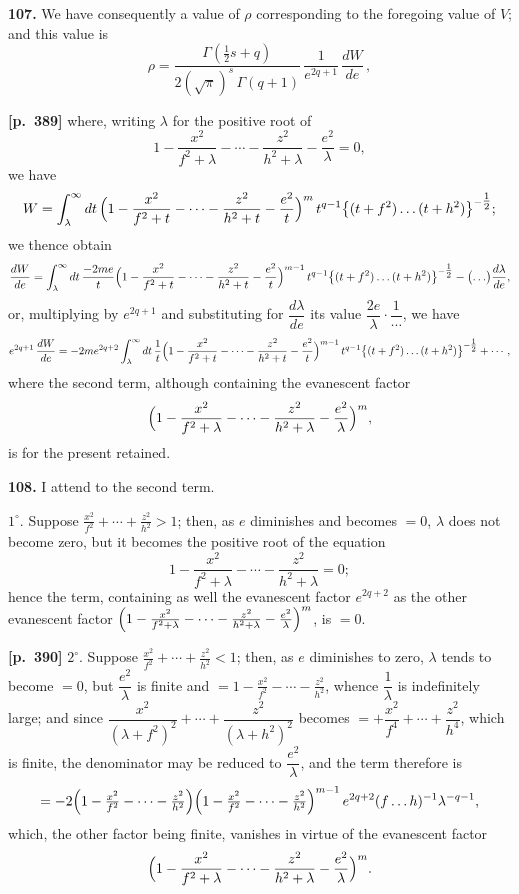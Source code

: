 \documentclass[11pt,a4paper]{article}
\begin{document}
\textbf{107.} We have consequently a value of $\rho$ corresponding to the foregoing value of $V$; and this value is
\[
\rho = \frac{\Gamma(\tfrac{1}{2}s + q)}{2(\sqrt{\pi})^{s}\,\Gamma(q+1)}\,\frac{1}{e^{2q+1}}\,\frac{dW}{de}\,,
\]

\noindent\textbf{[p.~389]}\quad
where, writing $\lambda$ for the positive root of
\[
1 - \frac{x^{2}}{f^{2}+\lambda} - \cdots - \frac{z^{2}}{h^{2}+\lambda} - \frac{e^{2}}{\lambda} = 0,
\]
we have
\[
W = \int_{\lambda}^{\infty} dt\,\Bigl(1 - \frac{x^{2}}{f^{2}+t} - \cdots - \frac{z^{2}}{h^{2}+t} - \frac{e^{2}}{t}\Bigr)^{m}\, t^{q-1}\bigl\{(t+f^{2})\ldots(t+h^{2})\bigr\}^{-\tfrac{1}{2}};
\]
we thence obtain
\[
\frac{dW}{de} = \int_{\lambda}^{\infty} dt\,\frac{-2me}{t}\Bigl(1 - \frac{x^{2}}{f^{2}+t} - \cdots - \frac{z^{2}}{h^{2}+t} - \frac{e^{2}}{t}\Bigr)^{m-1}\, t^{q-1}\bigl\{(t+f^{2})\ldots(t+h^{2})\bigr\}^{-\tfrac{1}{2}}
- \bigl(\ldots\bigr)\frac{d\lambda}{de},
\]
or, multiplying by $e^{2q+1}$ and substituting for $\dfrac{d\lambda}{de}$ its value $\dfrac{2e}{\lambda}\cdot\dfrac{1}{\cdots}$, we have
\[
e^{2q+1}\,\frac{dW}{de} = -2 m e^{2q+2}\int_{\lambda}^{\infty} dt\,\frac{1}{t}\Bigl(1 - \frac{x^{2}}{f^{2}+t} - \cdots - \frac{z^{2}}{h^{2}+t} - \frac{e^{2}}{t}\Bigr)^{m-1}\, t^{q-1}\bigl\{(t+f^{2})\ldots(t+h^{2})\bigr\}^{-\tfrac{1}{2}}
+ \cdots,
\]
where the second term, although containing the evanescent factor
\[
\Bigl(1 - \frac{x^{2}}{f^{2}+\lambda} - \cdots - \frac{z^{2}}{h^{2}+\lambda} - \frac{e^{2}}{\lambda}\Bigr)^{m},
\]
is for the present retained.

\textbf{108.} I attend to the second term.

\smallskip
$1^{\circ}$. Suppose $\tfrac{x^{2}}{f^{2}} + \cdots + \tfrac{z^{2}}{h^{2}} > 1$; then, as $e$ diminishes and becomes $= 0$, $\lambda$ does not become zero, but it becomes the positive root of the equation
\[
1 - \frac{x^{2}}{f^{2}+\lambda} - \cdots - \frac{z^{2}}{h^{2}+\lambda} = 0;
\]
hence the term, containing as well the evanescent factor $e^{2q+2}$ as the other evanescent factor $\Bigl(1 - \frac{x^{2}}{f^{2}+\lambda} - \cdots - \frac{z^{2}}{h^{2}+\lambda} - \frac{e^{2}}{\lambda}\Bigr)^{m}$, is $= 0$.

\noindent\textbf{[p.~390]}\quad
$2^{\circ}$. Suppose $\tfrac{x^{2}}{f^{2}} + \cdots + \tfrac{z^{2}}{h^{2}} < 1$; then, as $e$ diminishes to zero, $\lambda$ tends to become $= 0$, but $\dfrac{e^{2}}{\lambda}$ is finite and $= 1 - \tfrac{x^{2}}{f^{2}} - \cdots - \tfrac{z^{2}}{h^{2}}$, whence $\dfrac{1}{\lambda}$ is indefinitely large; and since $\dfrac{x^{2}}{(\lambda + f^{2})^{2}} + \cdots + \dfrac{z^{2}}{(\lambda + h^{2})^{2}}$ becomes $= + \dfrac{x^{2}}{f^{4}} + \cdots + \dfrac{z^{2}}{h^{4}}$, which is finite, the denominator may be reduced to $\dfrac{e^{2}}{\lambda}$, and the term therefore is
\[
= -2\Bigl(1 - \tfrac{x^{2}}{f^{2}} - \cdots - \tfrac{z^{2}}{h^{2}}\Bigr)\Bigl(1 - \tfrac{x^{2}}{f^{2}} - \cdots - \tfrac{z^{2}}{h^{2}}\Bigr)^{m-1}\,e^{2q+2}(f\ldots h)^{-1}\lambda^{-q-1},
\]
which, the other factor being finite, vanishes in virtue of the evanescent factor
\[
\Bigl(1 - \frac{x^{2}}{f^{2}+\lambda} - \cdots - \frac{z^{2}}{h^{2}+\lambda} - \frac{e^{2}}{\lambda}\Bigr)^{m}.
\]
\end{document}
